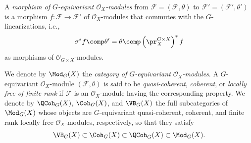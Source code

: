 \begin{defn}
A \emph{morphism of $G$-equivariant $\mathcal{O}_X$-modules}
from
$\mathcal{F}=(\mathcal{F}, \theta)$
to
$\mathcal{F}'=(\mathcal{F}', \theta')$
is a morphism
$
f : \mathcal{F} \rightarrow \mathcal{F}'
$
of $\mathcal{O}_X$-modules
that commutes with the $G$-linearizations,
i.e.,
$$
\sigma^* f \comp \theta'
=
\theta \comp \left(\pr_X^{G \times X}\right)^* f
$$
as morphisms of $\mathcal{O}_{G \times X}$-modules.





We denote by
$\Mod_G(X)$
the \emph{category of $G$-equivariant $\mathcal{O}_X$-modules}.
A $G$-equivariant $\mathcal{O}_X$-module $(\mathcal{F},\theta)$
is said to be
\emph{quasi-coherent}, \emph{coherent},
or \emph{locally free of finite rank}
if $\mathcal{F}$
is an $\mathcal{O}_X$-module having the corresponding property.
We denote by
$\QCoh_G(X)$,
$\Coh_G(X)$,
and
$\VB_G(X)$
the full subcategories of $\Mod_G(X)$
whose objects are
$G$-equivariant quasi-coherent, coherent, and finite rank locally free $\mathcal{O}_X$-modules,
respectively,
so that they satisfy
$$
\VB_G(X)\subset\Coh_G(X)\subset\QCoh_G(X)\subset\Mod_G(X).
$$
\end{defn}




